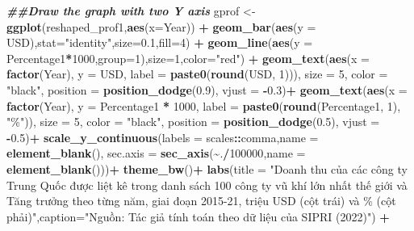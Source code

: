\documentclass[
]{article}
\newenvironment{Shaded}{\begin{snugshade}}{\end{snugshade}}
\newcommand{\AttributeTok}[1]{\textcolor[rgb]{0.13,0.29,0.53}{#1}}
\newcommand{\DecValTok}[1]{\textcolor[rgb]{0.00,0.00,0.81}{#1}}
\newcommand{\DocumentationTok}[1]{\textcolor[rgb]{0.56,0.35,0.01}{\textbf{\textit{#1}}}}
\newcommand{\FloatTok}[1]{\textcolor[rgb]{0.00,0.00,0.81}{#1}}
\newcommand{\FunctionTok}[1]{\textcolor[rgb]{0.13,0.29,0.53}{\textbf{#1}}}
\newcommand{\NormalTok}[1]{#1}
\newcommand{\OtherTok}[1]{\textcolor[rgb]{0.56,0.35,0.01}{#1}}
\newcommand{\SpecialCharTok}[1]{\textcolor[rgb]{0.81,0.36,0.00}{\textbf{#1}}}
\newcommand{\StringTok}[1]{\textcolor[rgb]{0.31,0.60,0.02}{#1}}
\begin{document}
\begin{Shaded}
\begin{Highlighting}[]
\DocumentationTok{\#\#Draw the graph with two Y axis}
\NormalTok{gprof }\OtherTok{\textless{}{-}} \FunctionTok{ggplot}\NormalTok{(reshaped\_prof1,}\FunctionTok{aes}\NormalTok{(}\AttributeTok{x=}\NormalTok{Year)) }\SpecialCharTok{+}
    \FunctionTok{geom\_bar}\NormalTok{(}\FunctionTok{aes}\NormalTok{(}\AttributeTok{y =}\NormalTok{ USD),}\AttributeTok{stat=}\StringTok{"identity"}\NormalTok{,}\AttributeTok{size=}\FloatTok{0.1}\NormalTok{,}\AttributeTok{fill=}\DecValTok{4}\NormalTok{) }\SpecialCharTok{+}
    \FunctionTok{geom\_line}\NormalTok{(}\FunctionTok{aes}\NormalTok{(}\AttributeTok{y =}\NormalTok{ Percentage1}\SpecialCharTok{*}\DecValTok{1000}\NormalTok{,}\AttributeTok{group=}\DecValTok{1}\NormalTok{),}\AttributeTok{size=}\DecValTok{1}\NormalTok{,}\AttributeTok{color=}\StringTok{"red"}\NormalTok{) }\SpecialCharTok{+}
    \FunctionTok{geom\_text}\NormalTok{(}\FunctionTok{aes}\NormalTok{(}\AttributeTok{x =} \FunctionTok{factor}\NormalTok{(Year), }\AttributeTok{y =}\NormalTok{ USD, }\AttributeTok{label =} \FunctionTok{paste0}\NormalTok{(}\FunctionTok{round}\NormalTok{(USD, }\DecValTok{1}\NormalTok{))),}
    \AttributeTok{size =} \DecValTok{5}\NormalTok{, }\AttributeTok{color =} \StringTok{"black"}\NormalTok{, }\AttributeTok{position =} \FunctionTok{position\_dodge}\NormalTok{(}\FloatTok{0.9}\NormalTok{), }\AttributeTok{vjust =} \SpecialCharTok{{-}}\FloatTok{0.3}\NormalTok{)}\SpecialCharTok{+}
    \FunctionTok{geom\_text}\NormalTok{(}\FunctionTok{aes}\NormalTok{(}\AttributeTok{x =} \FunctionTok{factor}\NormalTok{(Year), }\AttributeTok{y =}\NormalTok{ Percentage1 }\SpecialCharTok{*} \DecValTok{1000}\NormalTok{, }\AttributeTok{label =} \FunctionTok{paste0}\NormalTok{(}\FunctionTok{round}\NormalTok{(Percentage1, }\DecValTok{1}\NormalTok{), }\StringTok{"\%"}\NormalTok{)),}
    \AttributeTok{size =} \DecValTok{5}\NormalTok{, }\AttributeTok{color =} \StringTok{"black"}\NormalTok{, }\AttributeTok{position =} \FunctionTok{position\_dodge}\NormalTok{(}\FloatTok{0.5}\NormalTok{), }\AttributeTok{vjust =} \SpecialCharTok{{-}}\FloatTok{0.5}\NormalTok{)}\SpecialCharTok{+}
    \FunctionTok{scale\_y\_continuous}\NormalTok{(}\AttributeTok{labels =}\NormalTok{ scales}\SpecialCharTok{::}\NormalTok{comma,}\AttributeTok{name =} \FunctionTok{element\_blank}\NormalTok{(), }\AttributeTok{sec.axis =} \FunctionTok{sec\_axis}\NormalTok{(}\SpecialCharTok{\textasciitilde{}}\NormalTok{.}\SpecialCharTok{/}\DecValTok{100000}\NormalTok{,}\AttributeTok{name =} \FunctionTok{element\_blank}\NormalTok{()))}\SpecialCharTok{+}
    \FunctionTok{theme\_bw}\NormalTok{()}\SpecialCharTok{+}
    \FunctionTok{labs}\NormalTok{(}\AttributeTok{title =} \StringTok{"Doanh thu của các công ty Trung Quốc được liệt kê trong danh sách 100 công ty vũ khí lớn nhất thế giới và Tăng trưởng theo từng năm, giai đoạn 2015{-}21, triệu USD (cột trái) và \% (cột phải)"}\NormalTok{,}\AttributeTok{caption=}\StringTok{"Nguồn: Tác giả tính toán theo dữ liệu của SIPRI (2022)"}\NormalTok{) }\SpecialCharTok{+}

\end{Highlighting}
\end{Shaded}
\end{document}
